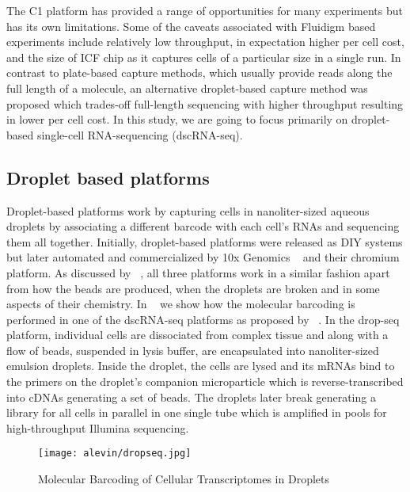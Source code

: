 The C1 platform has provided a range of opportunities for many experiments but has its own limitations. Some of the caveats associated with Fluidigm based experiments include relatively low throughput, in expectation higher per cell cost, and the size of ICF chip as it captures cells of a particular size in a single run. In contrast to plate-based capture methods, which usually provide reads along the full length of a molecule, an alternative droplet-based capture method \citep{dropseq, indrop, tenx} was proposed which trades-off full-length sequencing with higher throughput resulting in lower per cell cost. In this study, we are going to focus primarily on droplet-based single-cell RNA-sequencing (dscRNA-seq).

\subsection{Droplet based platforms ~\citep{dropseq, indrop, tenx}} 
\label{intro:droplet}
Droplet-based platforms work by capturing cells in nanoliter-sized aqueous droplets by associating a different barcode with each cell’s RNAs and sequencing them all together. Initially, droplet-based platforms were released as DIY systems but later automated and commercialized by 10x Genomics ~\citep{tenx} and their chromium platform.
As discussed by ~\citet{lukesthesis}, all three platforms work in a similar fashion apart from how the beads are produced, when the droplets are broken and in some aspects of their chemistry. In ~ we show how the molecular barcoding is performed in one of the dscRNA-seq platforms as proposed by ~\citep{dropseq}. In the drop-seq platform, individual cells are dissociated from complex tissue and along with a flow of beads, suspended in lysis buffer, are encapsulated into nanoliter-sized emulsion droplets. Inside the droplet, the cells are lysed and its mRNAs bind to the primers on the droplet's companion microparticle which is reverse-transcribed into cDNAs generating a set of beads. The droplets later break generating a library for all cells in parallel in one single tube which is amplified in pools for high-throughput Illumina sequencing. 

\begin{figure*}
 \centering
 \texttt{[image: alevin/dropseq.jpg]}
  \caption{Molecular Barcoding of Cellular Transcriptomes in Droplets \citep{dropseq}}
  \label{fig:dropprep}
\end{figure*}

